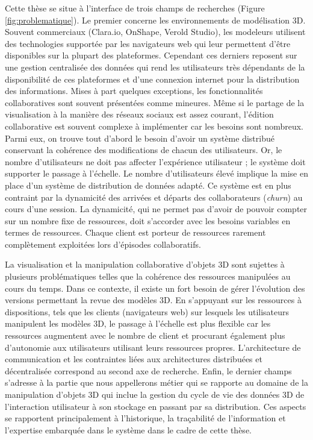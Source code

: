 Cette thèse se situe à l'interface de trois champs de recherches (Figure 
\ref{fig:problematique}). Le premier concerne les environnements de modélisation 
3D. Souvent commerciaux (Clara.io, OnShape, Verold Studio), les modeleurs 
utilisent des technologies supportée par les navigateurs web qui leur permettent 
d'être disponibles sur la plupart des plateformes. 
Cependant ces derniers reposent sur une gestion centralisée des données qui rend 
les utilisateurs très dépendants de la disponibilité de ces plateformes et d'une 
connexion internet pour la distribution des informations. 
Mises à part quelques exceptions, les fonctionnalités collaboratives 
sont souvent présentées comme mineures. Même si le \og partage\fg{} de la 
visualisation à la manière des \og réseaux sociaux\fg{} est assez courant, l'édition 
collaborative est souvent complexe à implémenter car les besoins sont nombreux. 
Parmi eux, on trouve tout d'abord le besoin d'avoir un système distribué 
conservant la cohérence des modifications de chacun des utilisateurs. Or, 
le nombre d'utilisateurs ne doit pas affecter l'expérience utilisateur ; le système 
doit supporter le passage à l'échelle. 
Le nombre d'utilisateurs élevé implique la mise en place d'un système de 
distribution de données adapté. Ce système est en plus contraint par la dynamicité
des arrivées et départs des collaborateurs (\textit{churn}) au cours d'une session. 
La dynamicité, qui ne permet pas d'avoir de pouvoir compter sur un nombre fixe de 
ressources, doit s'accorder avec les besoins variables en termes de ressources. 
Chaque client est porteur de ressources rarement complètement exploitées lors 
d'épisodes collaboratifs.

La visualisation et la manipulation collaborative d'objets \gls{3D} sont sujettes à 
plusieurs problématiques telles que la cohérence des ressources manipulées au 
cours du temps. Dans ce contexte, il existe un fort besoin de gérer l'évolution des 
versions permettant la revue des modèles \gls{3D}. 
En s'appuyant sur les ressources à dispositions, tels que les clients (navigateurs 
web) sur lesquels les utilisateurs manipulent les modèles \gls{3D}, le passage à 
l'échelle est plus flexible car les ressources augmentent avec le nombre de client 
et procurant également plus d'autonomie aux utilisateurs utilisant leurs ressources 
propres.
L'architecture de communication et les contraintes liées aux architectures 
distribuées et décentralisée correspond au second axe de recherche. 
Enfin, le dernier champs 
s'adresse à la partie que nous appellerons \og métier\fg{} qui se rapporte au 
domaine de la manipulation d'objets 3D qui inclue la 
gestion du cycle de vie des données 3D de l'interaction utilisateur à son stockage 
en passant par sa distribution. Ces aspects se rapportent principalement à 
l'historique, la traçabilité de l'information et l'expertise embarquée dans le système 
dans le cadre de cette thèse.

